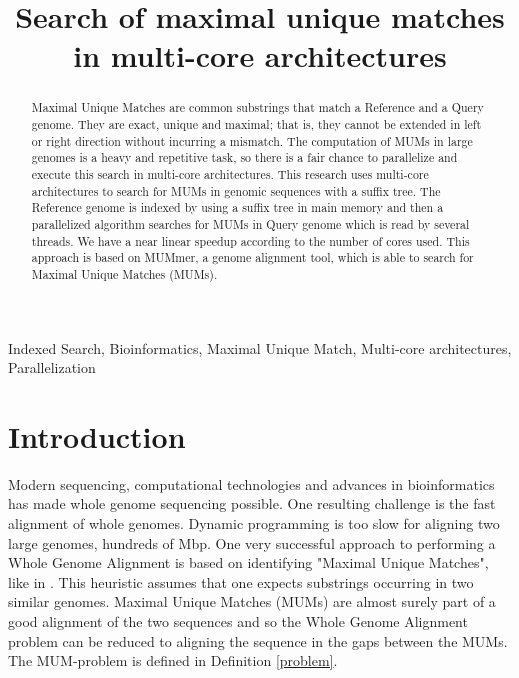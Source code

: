\documentclass[conference]{IEEEtran}
\begin{document}
\title{Search of maximal unique matches in multi-core architectures}

\author{
\and
{}
\and
{}}

\maketitle

\begin{abstract}
  Maximal Unique Matches are common substrings that match a Reference and a Query genome. They are exact, unique and maximal; that is, they cannot be extended in left or right direction without incurring a mismatch. The computation of MUMs in large genomes is a heavy and repetitive task, so there is a fair chance to parallelize and execute this search in multi-core architectures. This research uses multi-core architectures to search for MUMs in genomic sequences with a suffix tree. The Reference genome is indexed by using a suffix tree in main memory and then a parallelized algorithm searches for MUMs in Query genome which is read by several threads. We have a near linear speedup according to the number of cores used. This approach is based on MUMmer, a genome alignment tool, which is able to search for Maximal Unique Matches (MUMs). 
\end{abstract}

\begin{IEEEkeywords}
Indexed Search, Bioinformatics, Maximal Unique Match, Multi-core architectures, Parallelization
\end{IEEEkeywords}

\section{Introduction} 
\label{}
Modern sequencing, computational technologies and advances in bioinformatics has made whole genome sequencing possible. One resulting challenge is the fast alignment of whole genomes. Dynamic programming is too slow for aligning two large genomes, hundreds of Mbp. One very successful approach to performing a Whole Genome Alignment is based on identifying "Maximal Unique Matches", like in \cite{Delcher1999}. This heuristic assumes that one expects substrings occurring in two similar genomes. Maximal Unique Matches (MUMs) are almost surely part of a good alignment of the two sequences and so the Whole Genome Alignment problem can be reduced to aligning the sequence in the gaps between the MUMs. The MUM-problem is defined in Definition \ref{problem}.
\end{document}
